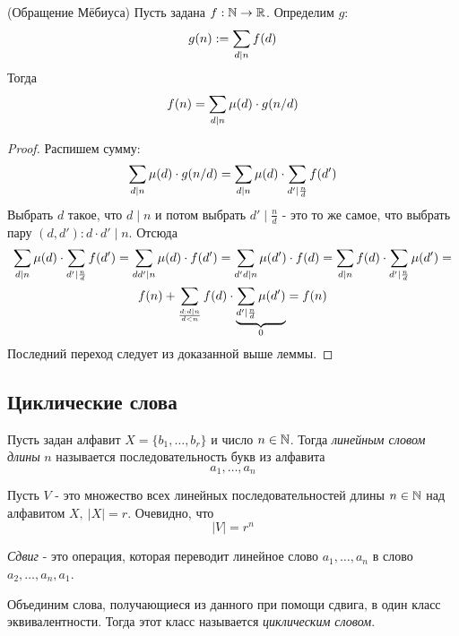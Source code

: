 \begin{theorem} (Обращение Мёбиуса)
	Пусть задана $f : \mathbb{N} \rightarrow \mathbb{R}$. Определим $g$:
	\[
		g(n) := \sum\limits_{d \mid n} f(d)
	\]
	Тогда
	\[
		f(n) = \sum\limits_{d \mid n} \mu(d) \cdot g(n / d)
	\]
\end{theorem}

\begin{proof}
	Распишем сумму:
	\[
		\sum\limits_{d \mid n} \mu(d) \cdot g(n / d) = \sum\limits_{d \mid n} \mu(d) \cdot \sum\limits_{d' \mid \frac{n}{d}} f(d')
	\]
	Выбрать $d$ такое, что $d \mid n$ и потом выбрать $d' \mid \frac{n}{d}$ - это то же самое, что выбрать пару $(d, d'): d \cdot d' \mid n$. Отсюда
	\begin{multline*}
		\sum\limits_{d \mid n} \mu(d) \cdot \sum\limits_{d' \mid \frac{n}{d}} f(d') = \sum\limits_{dd' \mid n} \mu(d) \cdot f(d') = \sum\limits_{d'd \mid n} \mu(d') \cdot f(d) = \sum\limits_{d \mid n} f(d) \cdot \sum\limits_{d' \mid \frac{n}{d}} \mu(d') =
		\\
		f(n) + \sum\limits_{{d: d \mid n} \over d < n} f(d) \cdot \underbrace{\sum\limits_{d' \mid \frac{n}{d}} \mu(d')}_{0} = f(n) 
	\end{multline*}
	Последний переход следует из доказанной выше леммы.
\end{proof}

\subsection{Циклические слова}

\begin{definition}
	Пусть задан алфавит $X = \{b_1, \ldots, b_r\}$ и число $n \in \mathbb{N}$. Тогда \textit{линейным словом длины} $n$ называется последовательность букв из алфавита
	\[
		a_1, \ldots, a_n
	\]
\end{definition}

Пусть $V$ - это множество всех линейных последовательностей длины $n \in \mathbb{N}$ над алфавитом $X,\ |X| = r$. Очевидно, что
\[
	|V| = r^n
\]

\begin{definition}
	\textit{Сдвиг} - это операция, которая переводит линейное слово $a_1, \ldots, a_n$ в слово $a_2, \ldots, a_n, a_1$.
\end{definition}

\begin{definition}
	Объединим слова, получающиеся из данного при помощи сдвига, в один класс эквивалентности. Тогда этот класс называется \textit{циклическим словом}.
\end{definition}

